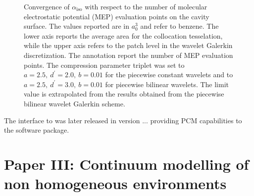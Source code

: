 \begin{figure}[tb]
 \centering
  \caption[Convergence of $\alpha_\mathrm{iso}$ with respect to the number of molecular
  electrostatic potential (MEP) evaluation points on the cavity surface.]
  {Convergence of $\alpha_\mathrm{iso}$ with respect to the number of
   molecular electrostatic potential (MEP) evaluation points on the cavity
   surface.
   The values reported are in $a_0^3$ and refer to benzene.
   The lower axis reports the average area for the collocation
   tesselation, while the upper axis refers to the patch level in the
   wavelet Galerkin discretization. The annotation report the number of
   MEP evaluation points.
   The compression parameter triplet was set to $a = 2.5,\ d^\prime =
   2.0,\ b = 0.01$ for the piecewise constant wavelets and to $a = 2.5,\
   d^\prime = 3.0,\ b = 0.01$ for piecewise bilinear wavelets.
   The limit value is extrapolated from the results obtained from the
   piecewise bilinear wavelet Galerkin scheme.}
  \label{fig:alpha_convergence}
\end{figure}


The interface to \LSDALTON was later released in version ...
providing \acs{PCM} capabilities to the software package.

\section*{Paper III: Continuum modelling of non homogeneous environments}






